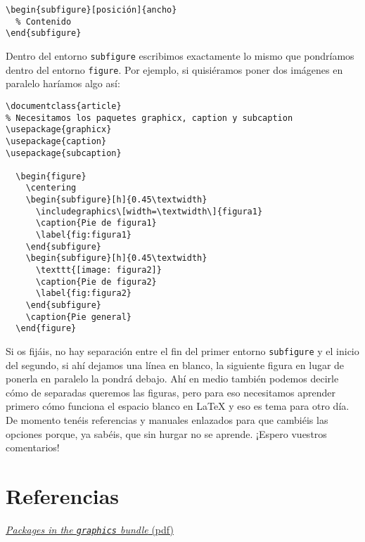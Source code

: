 \begin{lstlisting}[language={[latex]tex}]
\begin{subfigure}[posición]{ancho}
  % Contenido
\end{subfigure}
\end{lstlisting}

Dentro del entorno \lstinline!subfigure! escribimos exactamente lo mismo
que pondríamos dentro del entorno \lstinline!figure!. Por ejemplo, si
quisiéramos poner dos imágenes en paralelo haríamos algo así:

\begin{lstlisting}[language={[latex]tex}]
\documentclass{article}
% Necesitamos los paquetes graphicx, caption y subcaption
\usepackage{graphicx}
\usepackage{caption}
\usepackage{subcaption}

  \begin{figure}
    \centering
    \begin{subfigure}[h]{0.45\textwidth}
      \includegraphics\[width=\textwidth\]{figura1}
      \caption{Pie de figura1}
      \label{fig:figura1}
    \end{subfigure}
    \begin{subfigure}[h]{0.45\textwidth}
      \texttt{[image: figura2]}
      \caption{Pie de figura2}
      \label{fig:figura2}
    \end{subfigure}
    \caption{Pie general}
  \end{figure}

\end{lstlisting}

Si os fijáis, no hay separación entre el fin del primer entorno
\lstinline!subfigure! y el inicio del segundo, si ahí dejamos una línea
en blanco, la siguiente figura en lugar de ponerla en paralelo la pondrá
debajo. Ahí en medio también podemos decirle cómo de separadas queremos
las figuras, pero para eso necesitamos aprender primero cómo funciona el
espacio blanco en LaTeX y eso es tema para otro día. De momento tenéis
referencias y manuales enlazados para que cambiéis las opciones porque,
ya sabéis, que sin hurgar no se aprende. ¡Espero vuestros comentarios!

\section{Referencias}\label{referencias4}

\href{http://ctan.math.utah.edu/ctan/tex-archive/macros/latex/required/graphics/grfguide.pdf}{\emph{Packages
in the \lstinline!graphics! bundle} (pdf)}

